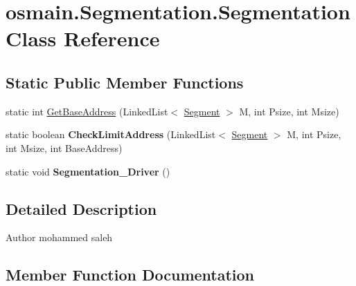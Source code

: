 \hypertarget{classosmain_1_1_segmentation_1_1_segmentation}{}\section{osmain.\+Segmentation.\+Segmentation Class Reference}
\label{classosmain_1_1_segmentation_1_1_segmentation}
\subsection*{Static Public Member Functions}
\begin{DoxyCompactItemize}
\item 
static int \hyperlink{classosmain_1_1_segmentation_1_1_segmentation_a6a8e30465f9b92b21f18fdf3715c6fc4}{Get\+Base\+Address} (Linked\+List$<$ \hyperlink{classosmain_1_1_segmentation_1_1_segment}{Segment} $>$ M, int Psize, int Msize)
\item 
static boolean {\bfseries Check\+Limit\+Address} (Linked\+List$<$ \hyperlink{classosmain_1_1_segmentation_1_1_segment}{Segment} $>$ M, int Psize, int Msize, int Base\+Address)\hypertarget{classosmain_1_1_segmentation_1_1_segmentation_aee8c5581547616cacfd403de7e88b11d}{}\label{classosmain_1_1_segmentation_1_1_segmentation_aee8c5581547616cacfd403de7e88b11d}

\item 
static void {\bfseries Segmentation\+\_\+\+Driver} ()\hypertarget{classosmain_1_1_segmentation_1_1_segmentation_a7f4d08301f80dcb18bcb3bde459b82f2}{}\label{classosmain_1_1_segmentation_1_1_segmentation_a7f4d08301f80dcb18bcb3bde459b82f2}

\end{DoxyCompactItemize}


\subsection{Detailed Description}
\begin{DoxyAuthor}{Author}
mohammed saleh 
\end{DoxyAuthor}


\subsection{Member Function Documentation}

